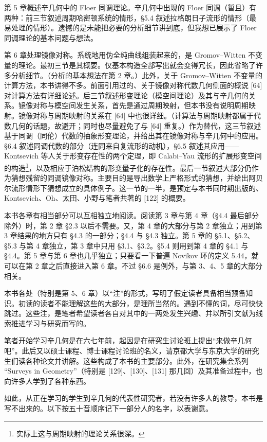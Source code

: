 第 5 章概述辛几何中的 Floer 同调理论。辛几何中出现的 Floer 同调（暂且）有两种：前三节叙述周期哈密顿系统的情形，§5.4 叙述拉格朗日子流形的情形（最易处理的情形）。遗憾的是未能把必要的分析细节讲到底，但我想已展示了 Floer 同调理论的基本问题与想法。

第 6 章处理镜像对称。系统地用伪全纯曲线组装起来的，是 Gromov–Witten 不变量的理论。最初三节是其概要。仅基本构造全部写出就会变得冗长，因此省略了许多分析细节。（分析的基本想法在第 2 章。）此外，关于 Gromov–Witten 不变量的计算方法，本书讲得不多。前面引用过的、关于镜像对称代数几何侧面的概说 [64] 对计算方法有详细论述。后三节叙述形变理论（模空间理论）及其与辛几何的关系。镜像对称与模空间发生关系，首先是通过周期映射，但本书没有说明周期映射。镜像对称与周期映射的关系在 [64] 中也很详细。（计算法与周期映射都属于代数几何的话题，故避开；同时也尽量避免了与 [64] 重复。）作为替代，这三节叙述基于同调（同伦）代数的抽象形变理论，并给出其在镜像对称与辛几何中的应用。§6.4 叙述同调代数的部分（连同来自复流形的动机），§6.5 叙述其应用——Kontsevich 等人关于形变存在性的两个定理，即 Calabi–Yau 流形的扩展形变空间的构造\footnote{实际上这与周期映射的理论关系很深。}，以及相应于泊松结构的形变量子化的存在性。最后一节叙述大部分仍作为猜想残留的同调镜像对称。主要目的是导出数学上严格形式的猜想，并给出阿贝尔流形情形下猜想成立的具体例子。这一节的一半，是预定与本书同时期出版的、Kontsevich、Oh、太田、小野与笔者共著的 [122] 的概要。

本书各章有相当部分可以互相独立地阅读。阅读第 3 章与第 4 章（§4.4 最后部分除外）时，第 2 章 §2.3 以后不需要。又，第 4 章的大部分与第 2 章独立；用到第 3 章结果的地方只有 §4.3 的一部分；§4.4 与 §4.3 独立。第 5 章的 §5.1、§5.2、§5.3 与第 4 章独立，第 3 章中只用 §3.1、§3.2。§5.4 则用到第 4 章的 §4.1 与 §4.4。第 5 章与第 6 章也几乎独立；只要看一下普遍 Novikov 环的定义 5.44，就可以在第 2 章之后直接进入第 6 章。不过 §6.6 是例外，与第 3、4、5 章的大部分相关。

本书各处（特别是第 5、6 章）以“注”的形式，写明了假定读者具备相当预备知识。初读的读者不能理解这些的大部分，是理所当然的。遇到不懂的词，尽可快快跳过。这些注，是笔者希望读者各自对其中的一两处发生兴趣、并以所引文献为线索推进学习与研究而写的。

笔者开始学习辛几何是在六七年前，起因是在研究生讨论班上提出“来做辛几何吧”。此后又以硕士课程、博士课程讨论班的名义，请京都大学与东京大学的研究生们读各种论文并讲解。这些构成了本书的主要部分。此外，在研究集会系列 “Surveys in Geometry”（特别是 [129]、[130]、[131] 那几回）及其准备过程中，也向许多人学到了各种东西。

如此，从正在学习的学生到辛几何的代表性研究者，若没有许多人的教导，本书是写不出来的。以下按五十音顺序记下一部分人的名字，以表谢意。

